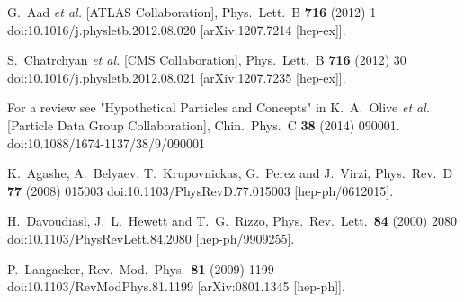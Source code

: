 
  G.~Aad {\it et al.} [ATLAS Collaboration],
  Phys.\ Lett.\ B {\bf 716} (2012) 1
  doi:10.1016/j.physletb.2012.08.020
  [arXiv:1207.7214 [hep-ex]].

  S.~Chatrchyan {\it et al.} [CMS Collaboration],
  Phys.\ Lett.\ B {\bf 716} (2012) 30
  doi:10.1016/j.physletb.2012.08.021
  [arXiv:1207.7235 [hep-ex]].


  For a review see "Hypothetical Particles and Concepts" in K.~A.~Olive {\it et al.} [Particle Data Group Collaboration],
  Chin.\ Phys.\ C {\bf 38} (2014) 090001.
  doi:10.1088/1674-1137/38/9/090001


  K.~Agashe, A.~Belyaev, T.~Krupovnickas, G.~Perez and J.~Virzi,
  Phys.\ Rev.\ D {\bf 77} (2008) 015003
  doi:10.1103/PhysRevD.77.015003
  [hep-ph/0612015].
  
  H.~Davoudiasl, J.~L.~Hewett and T.~G.~Rizzo,
  Phys.\ Rev.\ Lett.\  {\bf 84} (2000) 2080
  doi:10.1103/PhysRevLett.84.2080
  [hep-ph/9909255].
  
  P.~Langacker,
  Rev.\ Mod.\ Phys.\  {\bf 81} (2009) 1199
  doi:10.1103/RevModPhys.81.1199
  [arXiv:0801.1345 [hep-ph]].

